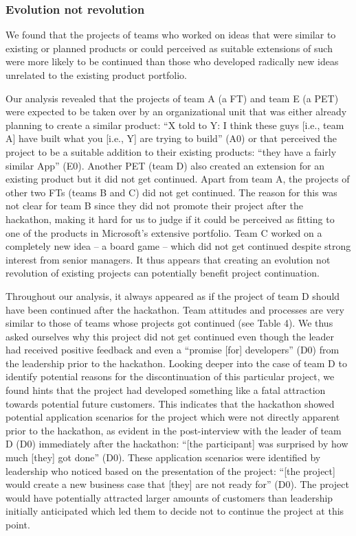 \documentclass{hcij}
\begin{document}
\subsubsection{Evolution not revolution}
We found that the projects of teams who worked on ideas that were similar to existing or planned products or could perceived as suitable extensions of such were more likely to be continued than those who developed radically new ideas unrelated to the existing product portfolio.

Our analysis revealed that the projects of team A (a FT) and team E (a PET) were expected to be taken over by an organizational unit that was either already planning to create a similar product: “X told to Y: I think these guys [i.e., team A] have built what you [i.e., Y] are trying to build” (A0) or that perceived the project to be a suitable addition to their existing products: “they have a fairly similar App” (E0). Another PET (team D) also created an extension for an existing product but it did not get continued. Apart from team A, the projects of other two FTs (teams B and C) did not get continued. The reason for this was not clear for team B since they did not promote their project after the hackathon, making it hard for us to judge if it could be perceived as fitting to one of the products in Microsoft’s extensive portfolio. Team C worked on a completely new idea – a board game – which did not get continued despite strong interest from senior managers. It thus appears that creating an evolution not revolution of existing projects can potentially benefit project continuation.

Throughout our analysis, it always appeared as if the project of team D should have been continued after the hackathon. Team attitudes and processes are very similar to those of teams whose projects got continued (see Table 4). We thus asked ourselves why this project did not get continued even though the leader had received positive feedback and even a “promise [for] developers” (D0) from the leadership prior to the hackathon. Looking deeper into the case of team D to identify potential reasons for the discontinuation of this particular project, we found hints that the project had developed something like a fatal attraction towards potential future customers. This indicates that the hackathon showed potential application scenarios for the project which were not directly apparent prior to the hackathon, as evident in the post-interview with the leader of team D (D0) immediately after the hackathon: “[the participant] was surprised by how much [they] got done” (D0). These application scenarios were identified by leadership who noticed based on the presentation of the project: “[the project] would create a new business case that [they] are not ready for” (D0). The project would have potentially attracted larger amounts of customers than leadership initially anticipated which led them to decide not to continue the project at this point.
\end{document}
